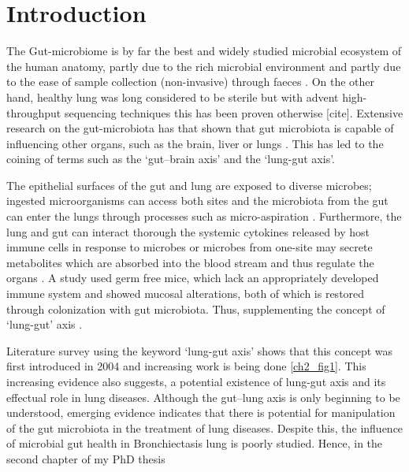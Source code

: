 \section*{Introduction}

The Gut-microbiome is by far the best and widely studied microbial ecosystem of the human anatomy, partly due to the rich microbial environment and partly due to the ease of sample collection (non-invasive) through faeces \cite{Budden2017}. On the other hand, healthy lung was long considered to be sterile but with advent high-throughput sequencing techniques this has been proven otherwise [cite]. Extensive research on the gut-microbiota has that shown that gut microbiota is capable of influencing other organs, such as the brain, liver or lungs \cite{Bell2019}. This has led to the coining of terms such as the `gut–brain axis' and the `lung-gut axis'. 

The epithelial surfaces of the gut and lung are exposed to diverse microbes; ingested microorganisms can access both sites and the microbiota from the gut can enter the lungs through processes such as micro-aspiration \cite{Budden2017}. Furthermore, the lung and gut can interact thorough the systemic cytokines released by host immune cells in response to microbes or  microbes from one-site may secrete metabolites which are absorbed into the blood stream and thus regulate the organs \cite{Dang2019}. A study used germ free mice, which lack an appropriately developed immune system and showed mucosal alterations, both of which is restored through colonization with gut microbiota. Thus, supplementing the concept of `lung-gut' axis \cite{Budden2017}. 

Literature survey using the keyword `lung-gut axis' shows that this concept was first introduced in 2004 and increasing work is being done \ref{ch2_fig1}. This increasing evidence also suggests, a potential existence of lung-gut axis and its effectual role in lung diseases. Although the gut–lung axis is only beginning to be understood, emerging evidence indicates that there is potential for manipulation of the gut microbiota in the treatment of lung diseases. Despite this, the influence of microbial gut health in Bronchiectasis lung is poorly studied. Hence, in the second chapter of my PhD thesis


